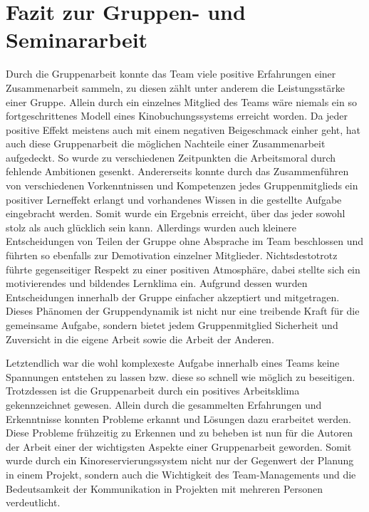 \section{Fazit zur Gruppen- und Seminararbeit}
\multipleauthorsection{\authorRF}{\authorEJ}

Durch die Gruppenarbeit konnte das Team viele positive Erfahrungen einer Zusammenarbeit sammeln, zu diesen zählt unter anderem die Leistungsstärke einer Gruppe.
Allein durch ein einzelnes Mitglied des Teams wäre niemals ein so fortgeschrittenes Modell eines Kinobuchungssystems erreicht worden.
Da jeder positive Effekt meistens auch mit einem negativen Beigeschmack einher geht, hat auch diese Gruppenarbeit die möglichen Nachteile einer Zusammenarbeit aufgedeckt.
So wurde zu verschiedenen Zeitpunkten die Arbeitsmoral durch fehlende Ambitionen gesenkt.
Andererseits konnte durch das Zusammenführen von verschiedenen Vorkenntnissen und Kompetenzen jedes Gruppenmitglieds ein positiver Lerneffekt erlangt und vorhandenes Wissen in die gestellte Aufgabe eingebracht werden.
Somit wurde ein Ergebnis erreicht, über das jeder sowohl stolz als auch glücklich sein kann.
Allerdings wurden auch kleinere Entscheidungen von Teilen der Gruppe ohne Absprache im Team beschlossen und führten so ebenfalls zur Demotivation einzelner Mitglieder.
Nichtsdestotrotz führte gegenseitiger Respekt zu einer positiven Atmosphäre, dabei stellte sich ein motivierendes und bildendes Lernklima ein.
Aufgrund dessen wurden Entscheidungen innerhalb der Gruppe einfacher akzeptiert und mitgetragen.
Dieses Phänomen der Gruppendynamik ist nicht nur eine treibende Kraft für die gemeinsame Aufgabe, sondern bietet jedem Gruppenmitglied Sicherheit und Zuversicht in die eigene Arbeit sowie die Arbeit der Anderen.


Letztendlich war die wohl komplexeste Aufgabe innerhalb eines Teams keine Spannungen entstehen zu lassen bzw. diese so schnell wie möglich zu beseitigen.
Trotzdessen ist die Gruppenarbeit durch ein positives Arbeitsklima gekennzeichnet gewesen.
Allein durch die gesammelten Erfahrungen und Erkenntnisse konnten Probleme erkannt und Lösungen dazu erarbeitet werden.
Diese Probleme frühzeitig zu Erkennen und zu beheben ist nun für die Autoren der Arbeit einer der wichtigsten Aspekte einer Gruppenarbeit geworden.
Somit wurde durch ein Kinoreservierungssystem nicht nur der Gegenwert der Planung in einem Projekt, sondern auch die Wichtigkeit des Team-Managements und die Bedeutsamkeit der Kommunikation in Projekten mit mehreren Personen verdeutlicht.
